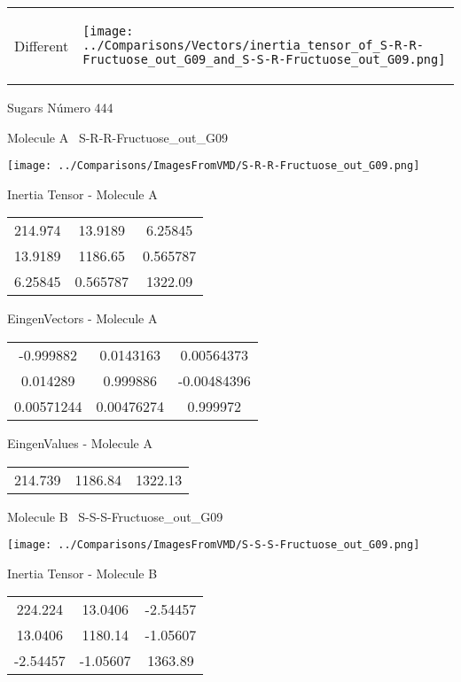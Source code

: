 \vtab[-5mm]
\begin{tabular}{*{2}{m{}}}
\begin{center}
\textcolor{NavyBlue}{\Large Different}
\end{center}
&
\begin{center}
\texttt{[image: ../Comparisons/Vectors/inertia\_tensor\_of\_S-R-R-Fructuose\_out\_G09\_and\_S-S-R-Fructuose\_out\_G09.png]}
\end{center}
\end{tabular}

 \newpage

\vtab[-3cm]
\begin{center}
{\large Sugars \tab Número 444}
\end{center}
\begin{multicols}{2}
\begin{center}

Molecule A \
S-R-R-Fructuose\_out\_G09

\texttt{[image: ../Comparisons/ImagesFromVMD/S-R-R-Fructuose\_out\_G09.png]}

Inertia Tensor - Molecule A \\
\begin{tabular}{|c c c|}
214.974	 & 	13.9189	 & 	6.25845	 \\
13.9189	 & 	1186.65	 & 	0.565787	 \\
6.25845	 & 	0.565787	 & 	1322.09
\end{tabular}

\vtab
 EingenVectors - Molecule A     \\
\begin{tabular}{|c c c|}
-0.999882	 & 	0.0143163	 & 	0.00564373	 \\
0.014289	 & 	0.999886	 & 	-0.00484396	 \\
0.00571244	 & 	0.00476274	 & 	0.999972
\end{tabular}

\vtab
 EingenValues - Molecule A     \\
\begin{tabular}{|c c c|}
214.739	 & 	1186.84	 & 	1322.13	 \\
\end{tabular}
\columnbreak

Molecule B \
S-S-S-Fructuose\_out\_G09

\texttt{[image: ../Comparisons/ImagesFromVMD/S-S-S-Fructuose\_out\_G09.png]}

Inertia Tensor - Molecule B \\
\begin{tabular}{|c c c|}
224.224	 & 	13.0406	 & 	-2.54457	 \\
13.0406	 & 	1180.14	 & 	-1.05607	 \\
-2.54457	 & 	-1.05607	 & 	1363.89
\end{tabular}


\end{center}
\end{multicols}
